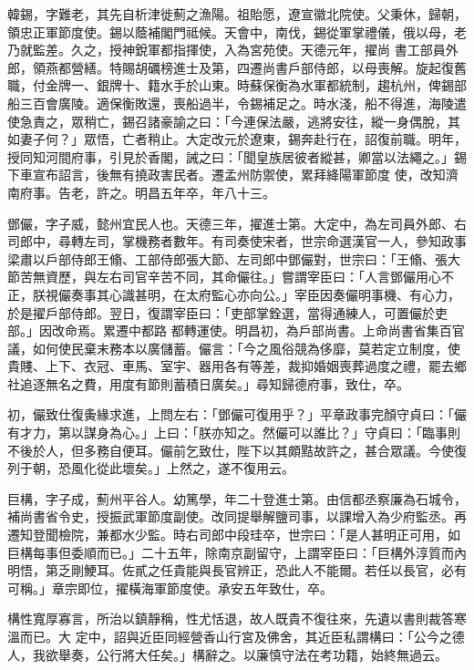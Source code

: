 \begin{pinyinscope}
 韓錫，字難老，其先自析津徙薊之漁陽。祖貽愿，遼宣徽北院使。父秉休，歸朝，領忠正軍節度使。錫以蔭補閣門祗候。天會中，南伐，錫從軍掌禮儀，俄以母，老乃就監差。久之，授神銳軍都指揮使，入為宮苑使。天德元年，擢尚
 書工部員外郎，領燕都營繕。特賜胡礪榜進士及第，四遷尚書戶部侍郎，以母喪解。旋起復舊職，付金牌一、銀牌十、籍水手於山東。時蘇保衡為水軍都統制，趨杭州，俾錫部船三百會廣陵。適保衡敗還，喪船過半，令錫補足之。時水淺，船不得進，海陵遣使急責之，眾稍亡，錫召諸豪諭之曰：「今連保法嚴，逃將安往，縱一身偶脫，其如妻子何？」眾悟，亡者稍止。大定改元於遼東，錫奔赴行在，詔復前職。明年，授同知河間府事，引見於香閣，誡之曰：「聞皇族居彼者縱甚，卿當以法繩之。」錫下車宣布詔言，後無有撓政害民者。遷孟州防禦使，累拜絳陽軍節度
 使，改知濟南府事。告老，許之。明昌五年卒，年八十三。



 鄧儼，字子威，懿州宜民人也。天德三年，擢進士第。大定中，為左司員外郎、右司郎中，尋轉左司，掌機務者數年。有司奏使宋者，世宗命選漢官一人，參知政事梁肅以戶部侍郎王翛、工部侍郎張大節、左司郎中鄧儼對，世宗曰：「王翛、張大節苦無資歷，與左右司官辛苦不同，其命儼往。」嘗謂宰臣曰：「人言鄧儼用心不正，朕視儼奏事其心識甚明，在太府監心亦向公。」宰臣因奏儼明事機、有心力，於是擢戶部侍郎。翌日，復謂宰臣曰：「吏部掌銓選，當得通練人，可置儼於吏部。」因改命焉。累遷中都路
 都轉運使。明昌初，為戶部尚書。上命尚書省集百官議，如何使民棄末務本以廣儲蓄。儼言：「今之風俗競為侈靡，莫若定立制度，使貴賤、上下、衣冠、車馬、室宇、器用各有等差，裁抑婚姻喪葬過度之禮，罷去鄉社追逐無名之費，用度有節則蓄積日廣矣。」尋知歸德府事，致仕，卒。



 初，儼致仕復夤緣求進，上問左右：「鄧儼可復用乎？」平章政事完顏守貞曰：「儼有才力，第以謀身為心。」上曰：「朕亦知之。然儼可以誰比？」守貞曰：「臨事則不後於人，但多務自便耳。儼前乞致仕，陛下以其頗黠故許之，甚合眾議。今使復列于朝，恐風化從此壞矣。」上然之，遂不復用云。



 巨構，字子成，薊州平谷人。幼篤學，年二十登進士第。由信都丞察廉為石城令，補尚書省令史，授振武軍節度副使。改同提舉解鹽司事，以課增入為少府監丞。再遷知登聞檢院，兼都水少監。時右司郎中段珪卒，世宗曰：「是人甚明正可用，如巨構每事但委順而已。」二十五年，除南京副留守，上謂宰臣曰：「巨構外淳質而內明悟，第乏剛鯁耳。佐貳之任貴能與長官辨正，恐此人不能爾。若任以長官，必有可稱。」章宗即位，擢橫海軍節度使。承安五年致仕，卒。



 構性寬厚寡言，所治以鎮靜稱，性尤恬退，故人既貴不復往來，先遺以書則裁答寒溫而已。大
 定中，詔與近臣同經營香山行宮及佛舍，其近臣私謂構曰：「公今之德人，我欲舉奏，公行將大任矣。」構辭之。以廉慎守法在考功籍，始終無過云。




\end{pinyinscope}
